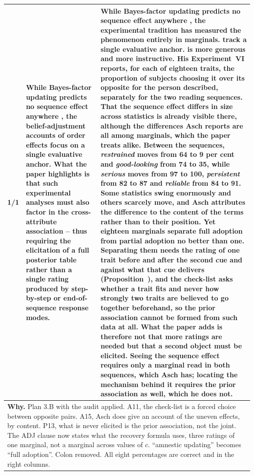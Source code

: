 \documentclass[10pt]{article}
\theoremstyle{definition}
\renewcommand{\ref}[1]{\textsc{\detokenize{#1}}}
\newlength{\fullw}\setlength{\fullw}{25.9cm}
\begin{document}
{\begin{longtable}{|p{0.9cm}|p{12.2cm}|p{12.2cm}|}
1/1 & While Bayes-factor updating predicts no sequence effect anywhere \citep{Wagner2002}, the belief-adjustment accounts of order effects \citep{HogarthEinhorn1992} focus on a single evaluative anchor. What the paper highlights is that such experimental analyses must also factor in the cross-attribute association -- thus requiring the elicitation of a full posterior table rather than a single rating produced by step-by-step or end-of-sequence response modes. & While Bayes-factor updating predicts no sequence effect anywhere \citep{Wagner2002}, the experimental tradition has measured the phenomenon entirely in marginals. \citet{HogarthEinhorn1992} track a single evaluative anchor. \citet{Asch1946} is more generous and more instructive. His Experiment~VI reports, for each of eighteen traits, the proportion of subjects choosing it over its opposite for the person described, separately for the two reading sequences. That the sequence effect differs in size across statistics is already visible there, although the differences Asch reports are all among marginals, which the paper treats alike. Between the sequences, \emph{restrained} moves from 64 to 9 per cent and \emph{good-looking} from 74 to 35, while \emph{serious} moves from 97 to 100, \emph{persistent} from 82 to 87 and \emph{reliable} from 84 to 91. Some statistics swing enormously and others scarcely move, and Asch attributes the difference to the content of the terms rather than to their position. Yet eighteen marginals separate full adoption from partial adoption no better than one. Separating them needs the rating of one trait before and after the second cue and against what that cue delivers (Proposition~\ref{prop:ADJ}), and the check-list asks whether a trait fits and never how strongly two traits are believed to go together beforehand, so the prior association cannot be formed from such data at all. What the paper adds is therefore not that more ratings are needed but that a second object must be elicited. Seeing the sequence effect requires only a marginal read in both sequences, which Asch has; locating the mechanism behind it requires the prior association as well, which he does not. \\ \hline
\multicolumn{3}{|p{\fullw}|}{\textbf{Why.} Plan 3.B with the audit applied. A11, the check-list is a forced choice between opposite pairs. A15, Asch does give an account of the uneven effects, by content. P13, what is never elicited is the prior association, not the joint. The ADJ clause now states what the recovery formula uses, three ratings of one marginal, not a marginal across values of $c$. ``amnestic updating'' becomes ``full adoption''. Colon removed. All eight percentages are correct and in the right columns.} \\

\end{longtable}}
\end{document}
